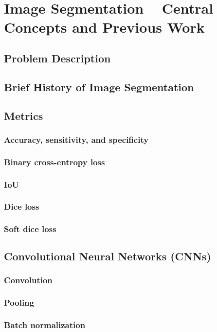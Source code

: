 \section{Image Segmentation -- Central Concepts and Previous Work}

\subsection{Problem Description}

\subsection{Brief History of Image Segmentation}

\subsection{Metrics}
  \subsubsection{Accuracy, sensitivity, and specificity}
  \subsubsection{Binary cross-entropy loss}
  \subsubsection{IoU}
  \subsubsection{Dice loss}
  \subsubsection{Soft dice loss}

\subsection{Convolutional Neural Networks (CNNs)}
  \subsubsection{Convolution}
  \subsubsection{Pooling}
  \subsubsection{Batch normalization}

